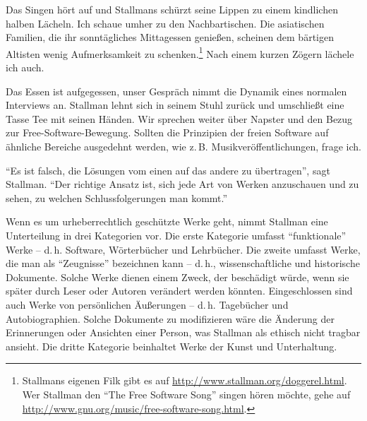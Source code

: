 Das Singen hört auf und Stallmans schürzt seine Lippen zu einem kindlichen halben Lächeln. Ich schaue umher zu den Nachbartischen. Die asiatischen Familien, die ihr sonntägliches Mittagessen genießen, scheinen dem bärtigen Altisten wenig Aufmerksamkeit zu schenken.\footnote{Stallmans eigenen Filk gibt es auf \url{http://www.stallman.org/doggerel.html}. Wer Stallman den "`The Free Software Song"' singen hören möchte, gehe auf \url{http://www.gnu.org/music/free-software-song.html}.} Nach einem kurzen Zögern lächele ich auch.


Das Essen ist aufgegessen, unser Gespräch nimmt die Dynamik eines normalen Interviews an. Stallman lehnt sich in seinem Stuhl zurück und umschließt eine Tasse Tee mit seinen Händen. Wir sprechen weiter über Napster und den Bezug zur Free-Software-Bewegung. Sollten die Prinzipien der freien Software auf ähnliche Bereiche ausgedehnt werden, wie z.\,B. Musikveröffentlichungen, frage ich.

"`Es ist falsch, die Lösungen vom einen auf das andere zu übertragen"', sagt Stallman. "`Der richtige Ansatz ist, sich jede Art von Werken anzuschauen und zu sehen, zu welchen Schlussfolgerungen man kommt."'

Wenn es um urheberrechtlich geschützte Werke geht, nimmt Stallman eine Unterteilung in drei Kategorien vor. Die erste Kategorie umfasst "`funktionale"' Werke – d.\,h. Software, Wörterbücher und Lehrbücher. Die zweite umfasst Werke, die man als "`Zeugnisse"' bezeichnen kann – d.\,h., wissenschaftliche und historische Dokumente. Solche Werke dienen einem Zweck, der beschädigt würde, wenn sie später durch Leser oder Autoren verändert werden könnten. Eingeschlossen sind auch Werke von persönlichen Äußerungen – d.\,h. Tagebücher und Autobiographien. Solche Dokumente zu modifizieren wäre die Änderung der Erinnerungen oder Ansichten einer Person, was Stallman als ethisch nicht tragbar ansieht. Die dritte Kategorie beinhaltet Werke der Kunst und Unterhaltung.

